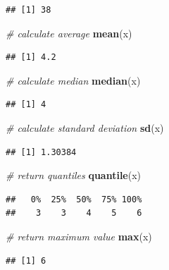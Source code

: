 \documentclass[]{book}
\newenvironment{Shaded}{\begin{snugshade}}{\end{snugshade}}
\newcommand{\KeywordTok}[1]{\textcolor[rgb]{0.13,0.29,0.53}{\textbf{#1}}}
\newcommand{\CommentTok}[1]{\textcolor[rgb]{0.56,0.35,0.01}{\textit{#1}}}
\newcommand{\NormalTok}[1]{#1}
\begin{document}
\begin{verbatim}
## [1] 38
\end{verbatim}

\begin{Shaded}
\begin{Highlighting}[]
\CommentTok{# calculate average}
\KeywordTok{mean}\NormalTok{(x)}
\end{Highlighting}
\end{Shaded}

\begin{verbatim}
## [1] 4.2
\end{verbatim}

\begin{Shaded}
\begin{Highlighting}[]
\CommentTok{# calculate median}
\KeywordTok{median}\NormalTok{(x)}
\end{Highlighting}
\end{Shaded}

\begin{verbatim}
## [1] 4
\end{verbatim}

\begin{Shaded}
\begin{Highlighting}[]
\CommentTok{# calculate standard deviation}
\KeywordTok{sd}\NormalTok{(x)}
\end{Highlighting}
\end{Shaded}

\begin{verbatim}
## [1] 1.30384
\end{verbatim}

\begin{Shaded}
\begin{Highlighting}[]
\CommentTok{# return quantiles}
\KeywordTok{quantile}\NormalTok{(x)}
\end{Highlighting}
\end{Shaded}

\begin{verbatim}
##   0%  25%  50%  75% 100% 
##    3    3    4    5    6
\end{verbatim}

\begin{Shaded}
\begin{Highlighting}[]
\CommentTok{# return maximum value}
\KeywordTok{max}\NormalTok{(x)}
\end{Highlighting}
\end{Shaded}

\begin{verbatim}
## [1] 6
\end{verbatim}
\end{document}
